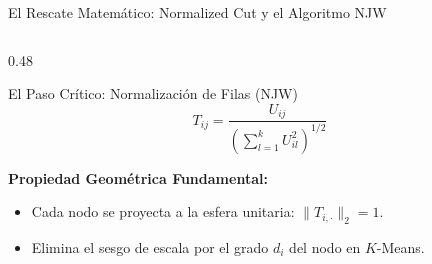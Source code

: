 \documentclass[aspectratio=169, 10pt]{beamer}
\begin{document}
\begin{frame}{El Rescate Matemático: Normalized Cut y el Algoritmo NJW}
\begin{columns}[c]
\begin{column}{0.48\textwidth}
\begin{block}{El Paso Crítico: Normalización de Filas (NJW)}
					$$T_{ij} = \frac{U_{ij}}{\left(\sum_{l=1}^k U_{il}^2\right)^{1/2}}$$
					

				\end{block}
				\vspace{0.2cm}
				\textbf{Propiedad Geométrica Fundamental:}
				\begin{itemize}
					\item Cada nodo se proyecta a la esfera unitaria: \(\|T_{i,\cdot}\|_2 = 1\).
					\item Elimina el sesgo de escala por el grado \(d_i\) del nodo en \(K\)-Means.
				\end{itemize}
			\end{column}
		\end{columns}

		
	\end{frame}
	
\end{document}
